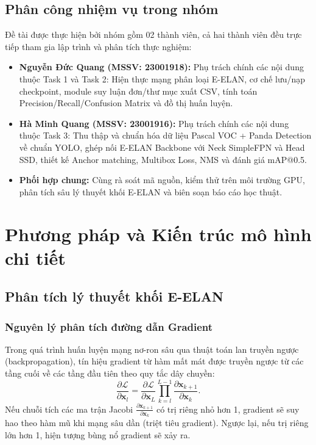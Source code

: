 \documentclass[fontsize=13pt,a4paper,oneside,DIV=calc,chapterprefix=true]{scrbook}
\begin{document}
\section{Phân công nhiệm vụ trong nhóm}
Đề tài được thực hiện bởi nhóm gồm 02 thành viên, cả hai thành viên đều trực tiếp tham gia lập trình và phân tích thực nghiệm:
\begin{itemize}[leftmargin=1.2cm]
    \item \textbf{Nguyễn Đức Quang (MSSV: 23001918):} Phụ trách chính các nội dung thuộc Task 1 và Task 2: Hiện thực mạng phân loại E-ELAN, cơ chế lưu/nạp checkpoint, module suy luận đơn/thư mục xuất CSV, tính toán Precision/Recall/Confusion Matrix và đồ thị huấn luyện.
    \item \textbf{Hà Minh Quang (MSSV: 23001916):} Phụ trách chính các nội dung thuộc Task 3: Thu thập và chuẩn hóa dữ liệu Pascal VOC + Panda Detection về chuẩn YOLO, ghép nối E-ELAN Backbone với Neck SimpleFPN và Head SSD, thiết kế Anchor matching, Multibox Loss, NMS và đánh giá mAP@0.5.
    \item \textbf{Phối hợp chung:} Cùng rà soát mã nguồn, kiểm thử trên môi trường GPU, phân tích sâu lý thuyết khối E-ELAN và biên soạn báo cáo học thuật.
\end{itemize}

\chapter{Phương pháp và Kiến trúc mô hình chi tiết}
\label{chap:method}

\section{Phân tích lý thuyết khối E-ELAN}

\subsection{Nguyên lý phân tích đường dẫn Gradient}
Trong quá trình huấn luyện mạng nơ-ron sâu qua thuật toán lan truyền ngược (backpropagation), tín hiệu gradient từ hàm mất mát được truyền ngược từ các tầng cuối về các tầng đầu tiên theo quy tắc dây chuyền:
\begin{equation}
\frac{\partial \mathcal{L}}{\partial \mathbf{x}_l} = \frac{\partial \mathcal{L}}{\partial \mathbf{x}_L} \prod_{k=l}^{L-1} \frac{\partial \mathbf{x}_{k+1}}{\partial \mathbf{x}_k}.
\label{eq:chain_rule}
\end{equation}
Nếu chuỗi tích các ma trận Jacobi $\frac{\partial \mathbf{x}_{k+1}}{\partial \mathbf{x}_k}$ có trị riêng nhỏ hơn 1, gradient sẽ suy hao theo hàm mũ khi mạng sâu dần (triệt tiêu gradient). Ngược lại, nếu trị riêng lớn hơn 1, hiện tượng bùng nổ gradient sẽ xảy ra. 
\end{document}
